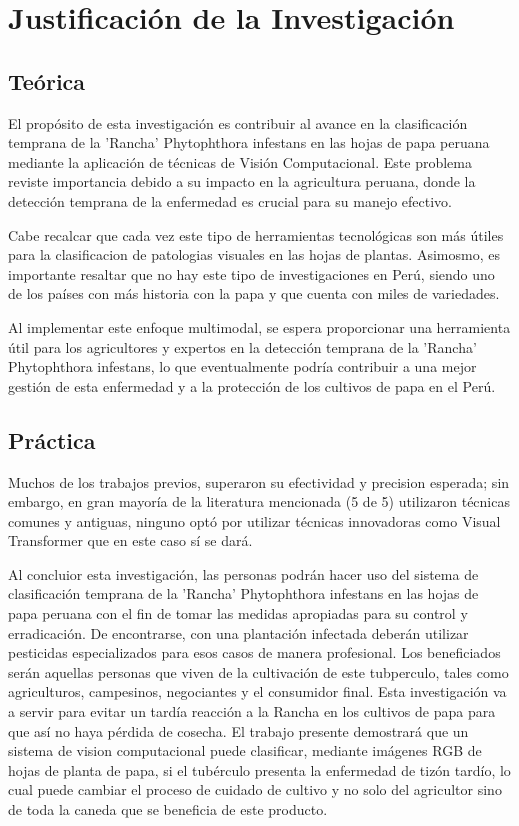 \section{Justificación de la Investigación}

\subsection{Teórica}
El propósito de esta investigación es contribuir al avance en la clasificación temprana de la 'Rancha' Phytophthora infestans en las hojas de papa peruana mediante la aplicación de técnicas de Visión Computacional. Este problema reviste importancia debido a su impacto en la agricultura peruana, donde la detección temprana de la enfermedad es crucial para su manejo efectivo.

Cabe recalcar que cada vez este tipo de herramientas tecnológicas son más útiles para la clasificacion de patologias visuales en las hojas de plantas. Asimosmo, es importante resaltar que no hay este tipo de investigaciones en Perú, siendo uno de los países con más historia con la papa y que cuenta con miles de variedades.

Al implementar este enfoque multimodal, se espera proporcionar una herramienta útil para los agricultores y expertos en la detección temprana de la 'Rancha' Phytophthora infestans, lo que eventualmente podría contribuir a una mejor gestión de esta enfermedad y a la protección de los cultivos de papa en el Perú. 
\subsection{Práctica}
Muchos de los trabajos previos, superaron su efectividad y precision esperada; sin embargo, en gran mayoría de la literatura mencionada (5 de 5) utilizaron técnicas comunes y antiguas, ninguno optó por utilizar técnicas innovadoras como Visual Transformer que en este caso sí se dará.


Al concluior esta investigación, las personas podrán hacer uso del sistema de clasificación temprana de la 'Rancha' Phytophthora infestans en las hojas de papa peruana con el fin de tomar las medidas apropiadas para su control y erradicación. De encontrarse, con una plantación infectada deberán utilizar pesticidas especializados para esos casos de manera profesional. Los beneficiados serán aquellas personas que viven de la cultivación de este tubperculo, tales como agriculturos, campesinos, negociantes y el consumidor final. Esta investigación va a servir para evitar un tardía reacción a la Rancha en los cultivos de papa para que así no haya pérdida de cosecha. El trabajo presente demostrará que un sistema de vision computacional puede clasificar, mediante imágenes RGB de hojas de planta de papa, si el tubérculo presenta la enfermedad de tizón tardío, lo cual puede cambiar el proceso de cuidado de cultivo y no solo del agricultor sino de toda la caneda que se beneficia de este producto.

